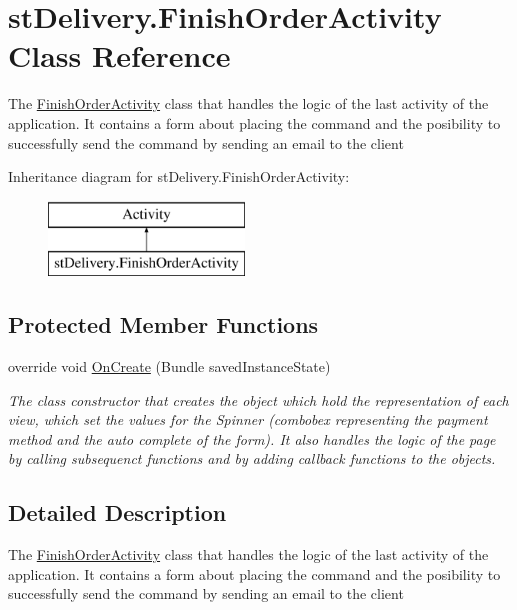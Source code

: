 \hypertarget{classst_delivery_1_1_finish_order_activity}{}\section{st\+Delivery.\+Finish\+Order\+Activity Class Reference}
\label{classst_delivery_1_1_finish_order_activity}


The \hyperlink{classst_delivery_1_1_finish_order_activity}{Finish\+Order\+Activity} class that handles the logic of the last activity of the application. It contains a form about placing the command and the posibility to successfully send the command by sending an email to the client  


Inheritance diagram for st\+Delivery.\+Finish\+Order\+Activity\+:\begin{figure}[H]
\begin{center}
\leavevmode
\includegraphics[height=2.000000cm]{classst_delivery_1_1_finish_order_activity}
\end{center}
\end{figure}
\subsection*{Protected Member Functions}
\begin{DoxyCompactItemize}
\item 
override void \hyperlink{classst_delivery_1_1_finish_order_activity_a5d64dbe6554f46e12556f93c38b365f8}{On\+Create} (Bundle saved\+Instance\+State)
\begin{DoxyCompactList}\small\item\em The class constructor that creates the object which hold the representation of each view, which set the values for the Spinner (combobex representing the payment method and the auto complete of the form). It also handles the logic of the page by calling subsequenct functions and by adding callback functions to the objects. \end{DoxyCompactList}\end{DoxyCompactItemize}


\subsection{Detailed Description}
The \hyperlink{classst_delivery_1_1_finish_order_activity}{Finish\+Order\+Activity} class that handles the logic of the last activity of the application. It contains a form about placing the command and the posibility to successfully send the command by sending an email to the client 



